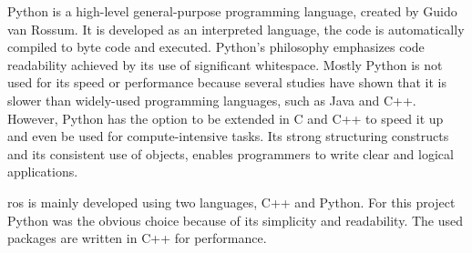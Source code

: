 
Python is a high\hyp{}level general\hyp{}purpose programming language, created by Guido van Rossum. It is developed as an interpreted language, the code is automatically compiled to byte code and executed. Python's philosophy emphasizes code readability achieved by its use of significant whitespace. Mostly Python is not used for its speed or performance because several studies have shown that it is slower than widely\hyp{}used programming languages, such as Java and C++. However, Python has the option to be extended in C and C++ to speed it up and even be used for compute\hyp{}intensive tasks. Its strong structuring constructs and its consistent use of objects, enables programmers to write clear and logical applications. \cite{kuhlman2009python}

\acs{ros} is mainly developed using two languages, C++ and Python. For this project Python was the obvious choice because of its simplicity and readability. The used packages are written in C++ for performance.